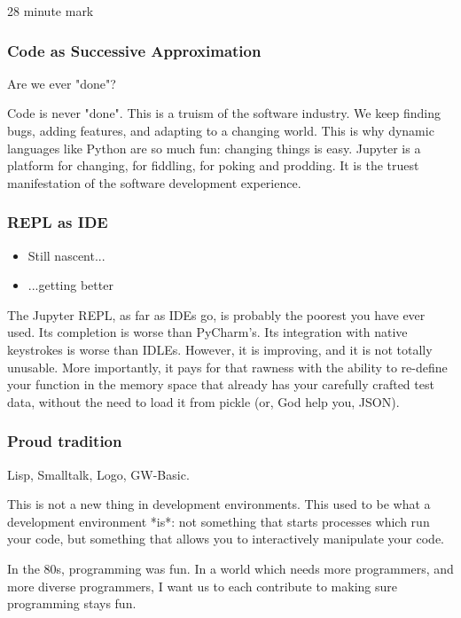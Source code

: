 28 minute mark

\begin{frame}
\frametitle{Code as Successive Approximation}

Are we ever "done"?

\end{frame}

Code is never "done".
This is a truism of the software industry.
We keep finding bugs,
adding features,
and adapting to a changing world.
This is why dynamic languages like Python are so much fun:
changing things is easy.
Jupyter is a platform for changing,
for fiddling,
for poking and prodding.
It is the truest manifestation of the software development experience.

\begin{frame}
\frametitle{REPL as IDE}

\begin{itemize}
\item Still nascent...
\item ...getting better
\end{itemize}

\end{frame}

The Jupyter REPL,
as far as IDEs go,
is probably the poorest you have ever used.
Its completion is worse than PyCharm's.
Its integration with native keystrokes is
worse than IDLEs.
However,
it is improving,
and it is not totally unusable.
More importantly,
it pays for that rawness with the ability
to re-define your function in the memory space
that already has your carefully crafted
test data,
without the need to load it from pickle
(or,
God help you,
JSON).

\begin{frame}
\frametitle{Proud tradition}

Lisp, Smalltalk, Logo, GW-Basic.

\end{frame}

This is not a new thing in development environments.
This used to be what a development environment *is*:
not something that starts processes which run your code,
but something that allows you to interactively manipulate your code.

In the 80s, programming was fun.
In a world which needs more programmers,
and more diverse programmers,
I want us to each contribute to making sure programming stays fun.


